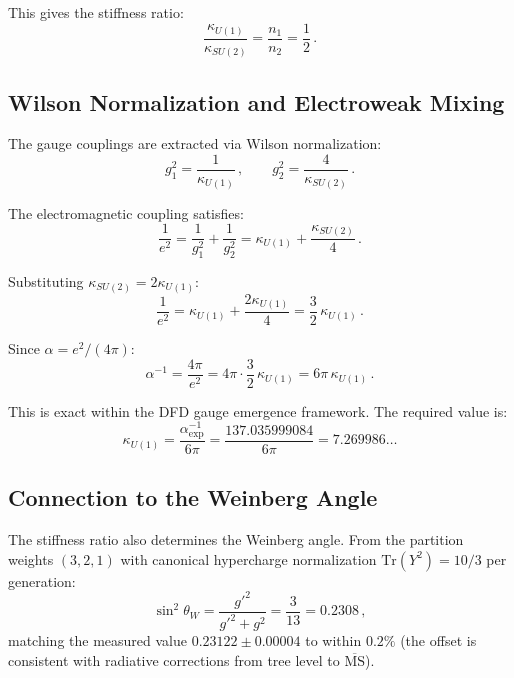 \documentclass[12pt,a4paper]{article}
\begin{document}
\noindent
This gives the stiffness ratio:
\begin{equation}
\frac{\kappa_{U(1)}}{\kappa_{SU(2)}} = \frac{n_1}{n_2} = \frac{1}{2}\,.
\end{equation}

\subsection{Wilson Normalization and Electroweak Mixing}

The gauge couplings are extracted via Wilson normalization:
\begin{equation}
g_1^2 = \frac{1}{\kappa_{U(1)}}\,,\qquad
g_2^2 = \frac{4}{\kappa_{SU(2)}}\,.
\end{equation}

The electromagnetic coupling satisfies:
\begin{equation}
\frac{1}{e^2} = \frac{1}{g_1^2} + \frac{1}{g_2^2}
= \kappa_{U(1)} + \frac{\kappa_{SU(2)}}{4}\,.
\end{equation}

Substituting $\kappa_{SU(2)} = 2\kappa_{U(1)}$:
\begin{equation}
\frac{1}{e^2} = \kappa_{U(1)} + \frac{2\kappa_{U(1)}}{4}
= \frac{3}{2}\,\kappa_{U(1)}\,.
\end{equation}

Since $\alpha = e^2/(4\pi)$:
\begin{equation}
\boxed{\alpha^{-1} = \frac{4\pi}{e^2}
= 4\pi \cdot \frac{3}{2}\,\kappa_{U(1)}
= 6\pi\,\kappa_{U(1)}\,.}
\end{equation}

This is exact within the DFD gauge emergence framework.
The required value is:
\begin{equation}
\kappa_{U(1)} = \frac{\alpha^{-1}_{\mathrm{exp}}}{6\pi}
= \frac{137.035999084}{6\pi} = 7.269986\ldots
\end{equation}

\subsection{Connection to the Weinberg Angle}

The stiffness ratio also determines the Weinberg angle. From the
partition weights $(3,2,1)$ with canonical hypercharge normalization
$\mathrm{Tr}(Y^2) = 10/3$ per generation:
\begin{equation}
\sin^2\theta_W = \frac{g'^2}{g'^2 + g^2}
= \frac{3}{13} = 0.2308\,,
\end{equation}
matching the measured value $0.23122 \pm 0.00004$ to within $0.2\%$
(the offset is consistent with radiative corrections from tree level
to $\overline{\mathrm{MS}}$).
\end{document}
